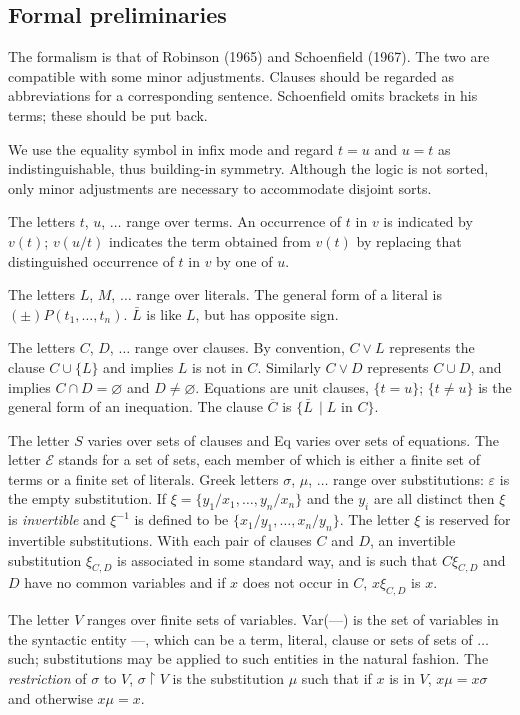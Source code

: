\documentclass[letterpaper]{report}
\begin{document}
\subsection*{Formal preliminaries}\label{formal-preliminaries}

The formalism is that of Robinson (1965) and Schoenfield (1967). The two
are compatible with some minor adjustments. Clauses should be regarded
as abbreviations for a corresponding sentence. Schoenfield omits
brackets in his terms; these should be put back.

We use the equality symbol in infix mode and regard $t = u$ and
$u = t$ as indistinguishable, thus building-in symmetry. Although the
logic is not sorted, only minor adjustments are necessary to accommodate
disjoint sorts.

The letters $t$, $u$, $\ldots$ range over terms. An occurrence of
$t$ in $v$ is indicated by $v(t)$; $v(u/t)$ indicates the term
obtained from $v(t)$ by replacing that distinguished occurrence of
$t$ in $v$ by one of $u$.

The letters $L$, $M$, $\ldots$ range over literals. The general
form of a literal is $(\pm)P(t_{1},\ldots,t_{n})$. $\bar{L}$ is
like $L$, but has opposite sign.

The letters $C$, $D$, $\ldots$ range over clauses. By convention,
$C \lor L$ represents the clause $C\cup\{L\}$ and implies $L$ is
not in $C$. Similarly $C\lor D$ represents $C\cup D$, and implies
$C\cap D = \varnothing$ and $D \neq \varnothing$. Equations are unit
clauses, $\{t = u\}$; $\{t \neq u\}$ is the general form of an
inequation. The clause $\overline{C}$ is $\{\bar{L}\,\mid L$ in
$C\}$.

The letter $S$ varies over sets of clauses and Eq varies over sets of
equations. The letter $\mathcal{E}$ stands for a set of sets, each
member of which is either a finite set of terms or a finite set of
literals. Greek letters $\sigma$, $\mu$, $\ldots$ range over
substitutions: $\varepsilon$ is the empty substitution. If
$\xi = \{y_{1}/x_{1},\ldots,y_{n}/x_{n}\}$ and the $y_{i}$ are all
distinct then $\xi$ is \emph{invertible} and $\xi^{-1}$ is defined
to be $\{x_{1}/y_{1},\ldots,x_{n}/y_{n}\}$. The letter $\xi$ is
reserved for invertible substitutions. With each pair of clauses $C$
and $D$, an invertible substitution $\xi_{C,D}$ is associated in
some standard way, and is such that $C\xi_{C,D}$ and $D$ have no
common variables and if $x$ does not occur in $C$, $x\xi_{C,D}$ is
$x$.

The letter $V$ ranges over finite sets of variables. Var(---) is
the set of variables in the syntactic entity ---, which can be a
term, literal, clause or sets of sets of $\ldots$ such; substitutions
may be applied to such entities in the natural fashion. The
\emph{restriction} of $\sigma$ to $V$, $\sigma \upharpoonright V$ is the
substitution $\mu$ such that if $x$ is in $V$, $x\mu = x\sigma$
and otherwise $x\mu = x$.
\end{document}
